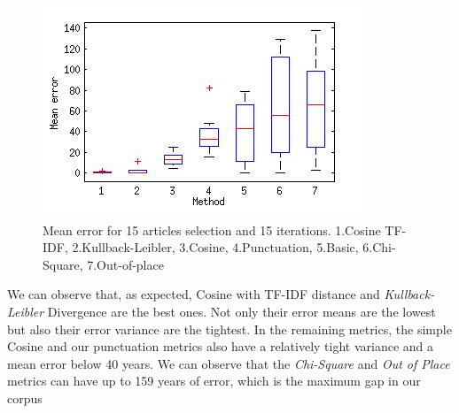 \begin{figure}[H]
	\centering
	\includegraphics[scale=0.70]{Pictures/date_articles/date_corpus.jpg}
        \caption{Mean error for 15 articles selection and 15 iterations. 1.Cosine TF-IDF, 2.Kullback-Leibler, 3.Cosine, 4.Punctuation, 5.Basic, 6.Chi-Square, 7.Out-of-place}
        \label{date_cv}
\end{figure}

We can observe that, as expected, Cosine with TF-IDF distance and \emph{Kullback-Leibler} Divergence are the best ones. Not only their error means are the lowest but also their error variance are the tightest. In the remaining metrics, the simple Cosine and our punctuation metrics also have a relatively tight variance and a mean error below 40 years. We can observe that the \emph{Chi-Square} and \emph{Out of Place} metrics can have up to 159 years of error, which is the maximum gap in our corpus\\

